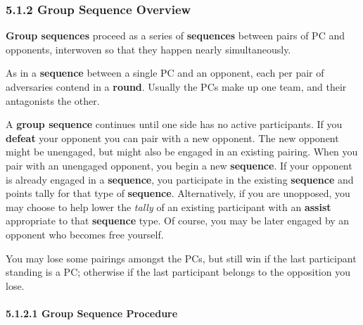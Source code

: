 \documentclass[
  11pt,
]{article}
\begin{document}
\hypertarget{group-sequence-overview}{%
\subsubsection{5.1.2 Group Sequence
Overview}\label{group-sequence-overview}}

\textbf{Group sequences} proceed as a series of \textbf{sequences}
between pairs of PC and opponents, interwoven so that they happen nearly
simultaneously.

As in a \textbf{sequence} between a single PC and an opponent, each per
pair of adversaries contend in a \textbf{round}. Usually the PCs make up
one team, and their antagonists the other.

A \textbf{group sequence} continues until one side has no active
participants. If you \textbf{defeat} your opponent you can pair with a
new opponent. The new opponent might be unengaged, but might also be
engaged in an existing pairing. When you pair with an unengaged
opponent, you begin a new \textbf{sequence}. If your opponent is already
engaged in a \textbf{sequence}, you participate in the existing
\textbf{sequence} and points tally for that type of \textbf{sequence}.
Alternatively, if you are unopposed, you may choose to help lower the
\emph{tally} of an existing participant with an \textbf{assist}
appropriate to that \textbf{sequence} type. Of course, you may be later
engaged by an opponent who becomes free yourself.

You may lose some pairings amongst the PCs, but still win if the last
participant standing is a PC; otherwise if the last participant belongs
to the opposition you lose.

\hypertarget{group-sequence-procedure}{%
\paragraph{5.1.2.1 Group Sequence
Procedure}\label{group-sequence-procedure}}
\end{document}
